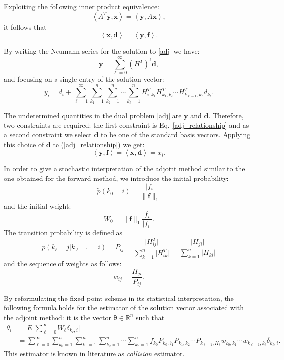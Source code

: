 \documentclass[final,leqno,onefignum,onetabnum]{siamltex1213}
\begin{document}
Exploiting the following inner product equivalence:
\[
\left\langle 
A^T\mathbf{y},\mathbf{x}\right\rangle=\left\langle\mathbf{y},A\mathbf{x} 
\right\rangle ,
\]
it follows that
\begin{equation}
\left\langle\mathbf{x},\mathbf{d}\right\rangle=\left\langle\mathbf{y},\mathbf{f}
\right\rangle.
\label{adj_relationship}
\end{equation}

By writing the Neumann series for the solution to \eqref{adj} we have:
\[
\mathbf{y}=\sum_{\ell=0}^{\infty} (H^T)^\ell \mathbf{d},
\]
and focusing on a single entry of the solution vector:
\[
y_i = d_i + \sum_{\ell=1}^{\infty}\sum_{k_1=1}^{n}\sum_{k_2=1}^n 
\cdots \sum_{k_{\ell}=1}^n H^T_{i,k_1} H^T_{k_1,k_2}\cdots 
H^T_{k_{\ell-1},k_{\ell}} d_{k_\ell}.
\]

The undetermined quantities in the dual problem \eqref{adj} are $\mathbf{y}$ 
and 
$\mathbf{d}$. Therefore, two constraints are required: the first constraint is 
Eq.~\eqref{adj_relationship} and as a second constraint we select
$\mathbf{d}$ to be one of the standard basis vectors.
Applying this choice of $\mathbf{d}$ to (\ref{adj_relationship}) we get:
\[
\left\langle\mathbf{y},\mathbf{f}\right\rangle=\left\langle\mathbf{x},\mathbf{d}
\right\rangle=x_i.
\]

In order to give a stochastic interpretation of the adjoint method similar to 
the one obtained for the forward method, we introduce the initial probability:
\[
\tilde{p}(k_0=i)=\frac{\lvert f_i\rvert}{\lVert 
\mathbf{f}\rVert_1}
\]
and the initial weight:
\[
W_0 = \lVert \mathbf{f}\rVert_1\frac{f_i}{\lvert f_i \rvert}.
\]
The transition probability is defined as 
\[
p(k_\ell = j \lvert k_{\ell-1}=i)=P_{ij}=\frac{\lvert 
H^T_{ij}\rvert}{\sum_{k=1}^n \lvert H^T_{ik}\rvert} = \frac{\lvert 
H_{ji}\rvert}{\sum_{k=1}^n \lvert H_{ki}\rvert}
\]
and the sequence of weights as follows:
\[
w_{ij}=\frac{H_{ji}}{P_{ij}}.
\]

By reformulating the fixed point scheme in its statistical interpretation, the 
following formula
holds for the estimator of the solution vector associated with the adjoint 
method: it is the vector $\boldsymbol{\theta}\in \mathbb{R}^n$ such that
\begin{equation}
\begin{array}{rl}
\theta_i& =E\bigg[\sum_{\ell=0}^\infty W_{\ell}\delta_{k_{\ell},
i}\bigg]\\
&={\displaystyle \sum_{\ell=0}^{\infty}\sum_{k_0=1}^n\sum_{k_1=1}^n\sum_{k_2=1}
^n\cdots\sum_ { k_ { \ell }=1 } ^n
f_{k_0}P_{k_0,k_1}P_{k_1,k_2}\cdots 
P_{k_{\ell-1},K_{\ell}}w_{k_0,k_1}\cdots
w_{k_{\ell-1},k_{\ell}}\delta_{k_{\ell},i}.}
\label{adj_mean}
\end{array}
\end{equation}
This estimator is known in literature as \textit{collision} estimator.
\end{document}
